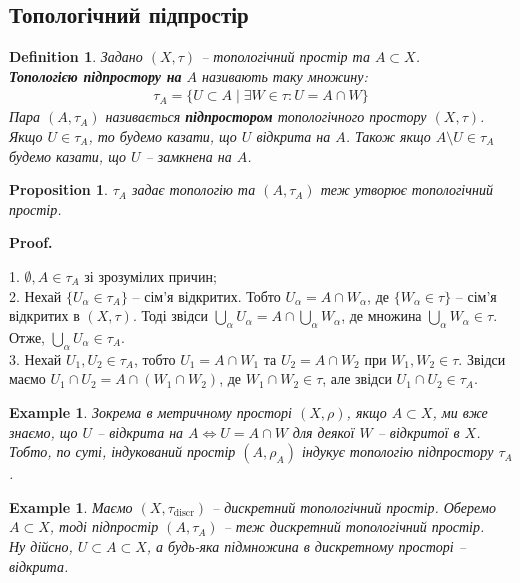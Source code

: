 \documentclass[a4paper, 10pt]{article}
\makeatletter
\theoremstyle{theoremdd}
\newtheorem{definition}[theorem]{Definition}
\newtheorem{example}[theorem]{Example}
\newtheorem{proposition}[theorem]{Proposition}
\renewenvironment{proof}[1][Proof.\\]{\par
\pushQED{\hfill \qed}%
\normalfont \topsep6\p@\@plus6\p@\relax
\trivlist
\item\relax
{\bfseries
#1\@addpunct{.}}\hspace\labelsep\ignorespaces
}{%
\popQED\endtrivlist\@endpefalse
}
\makeatother
\begin{document}
\subsection{Топологічний підпростір}
\begin{definition}
Задано $(X,\tau)$ -- топологічний простір та $A \subset X$.\\
\textbf{Топологією підпростору на} $A$ називають таку множину:
\begin{align*}
\tau_A = \{ U \subset A \mid \exists W \in \tau: U = A \cap W\}
\end{align*}
Пара $(A,\tau_A)$ називається \textbf{підпростором} топологічного простору $(X,\tau)$.\\
Якщо $U \in \tau_A$, то будемо казати, що $U$ відкрита на $A$. Також якщо $A \setminus U \in \tau_A$ будемо казати, що $U$ -- замкнена на $A$.
\end{definition}

\begin{proposition}
$\tau_A$ задає топологію та $(A,\tau_A)$ теж утворює топологічний простір.
\end{proposition}

\begin{proof}
1. $\emptyset,A \in \tau_A$ зі зрозумілих причин;\\
2. Нехай $\{U_\alpha \in \tau_A\}$ -- сім'я відкритих. Тобто $U_\alpha = A \cap W_\alpha$, де $\{W_\alpha \in \tau\}$ -- сім'я відкритих в $(X,\tau)$. Тоді звідси $\displaystyle\bigcup_\alpha U_\alpha = A \cap \bigcup_\alpha W_\alpha$, де множина $\displaystyle\bigcup_\alpha W_\alpha \in \tau$. Отже, $\displaystyle\bigcup_\alpha U_\alpha \in \tau_A$.\\
3. Нехай $U_1, U_2 \in \tau_A$, тобто $U_1 = A \cap W_1$ та $U_2 = A \cap W_2$ при $W_1,W_2 \in \tau$. Звідси маємо $U_1 \cap U_2 = A \cap (W_1 \cap W_2)$, де $W_1 \cap W_2 \in \tau$, але звідси $U_1 \cap U_2 \in \tau_A$.
\end{proof}

\begin{example}
Зокрема в метричному просторі $(X,\rho)$, якщо $A \subset X$, ми вже знаємо, що $U$ -- відкрита на $A \iff U = A \cap W$ для деякої $W$ -- відкритої в $X$. Тобто, по суті, індукований простір $(A,\rho_A)$ індукує топологію підпростору $\tau_A$.
\end{example}

\begin{example}
Маємо $(X,\tau_{\text{discr}})$ -- дискретний топологічний простір. Оберемо $A \subset X$, тоді підпростір $(A,\tau_{A})$ -- теж дискретний топологічний простір.\\
Ну дійсно, $U \subset A \subset X$, а будь-яка підмножина в дискретному просторі -- відкрита.
\end{example}
\end{document}
